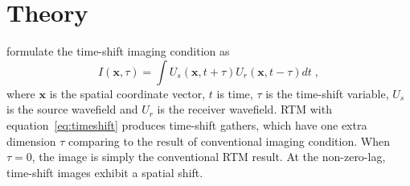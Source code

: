 \begin{comment}
The RTM method based on directly solving the two-way wave equation has been developed more than thirty years ago \cite[]{baysal83,mcmechan83,whitmore83}. 
Dispite its ability of dealing with large lateral velocity variation and imposing no dip limitations on the images, it hasn't found its way
into the mainstream industry until recently, which was mainly caused by its extremely expensive computational cost when compared to other migration methods \cite[]{dussaud08}.
Today's seismic imaging in complex geology requires both RTM and wide-azimuth, multi-azimuth or full-azimuth converage data, meaning the imaging process becomes
significantly more expensive.

To resolve this problem, researchers have developed many methods, either based on high performance tools or by designing new algorithms.
Parallel computing has been very commonly used in RTM due to its characteristic of easily being parallelized. 
For example, \cite{chu08} used a pseudospectral and finite difference hybrid approach to solve large-scale seismic modeling and RTM problems using MPI
on disributed memory systems.
\cite{foltinek09} gave an overview of an implementation of RTM on heterogeneous multi-core hardware based on GPUs and demonstrated 
the advantage of industrial-scale RTM on GPU hardware.
Phase encoding method \cite[]{morton98,romero00} is also very effective in reducing the computing time for common-shot RTM.
For example, \cite[]{zhang07} introduced a harmonic-source phase-encoding to allow increased efficiency in a delayed-shot RTM.
\cite{perrone09} compared the effects of different shot encoding functions for RTM.
Some algorithms capable of balancing the accuracy and efficiency of RTM are also proposed.
For example, \cite{fomel13} proposed to use lowrank approximation to implement  wave extrapolation, which provides a very flexible control 
between the accuracy and efficiency of RTM by setting different rank values.

However, phase encoded data causes strong crosstalk in RTM images,
and the algorithms capable of compromising accuracy for efficiency have a very limited efficiency gain.
\end{comment}

\section{Theory}
\cite{sava06} formulate the time-shift imaging condition as
\begin{equation}
I(\mathbf{x},\tau) = \int U_s(\mathbf{x},t+\tau) U_r(\mathbf{x},t-\tau) dt \; ,
\label{eq:timeshift}
\end{equation}
where $\mathbf{x}$ is the spatial coordinate vector, $t$ is time, $\tau$ is the time-shift variable, $U_s$ is the source wavefield
and $U_r$ is the receiver wavefield.
RTM with equation~\ref{eq:timeshift} produces time-shift gathers, which have one extra dimension $\tau$ 
comparing to the result of conventional imaging condition.
When $\tau=0$, the image is simply the conventional RTM result. 
At the non-zero-lag, time-shift images exhibit a spatial shift.


